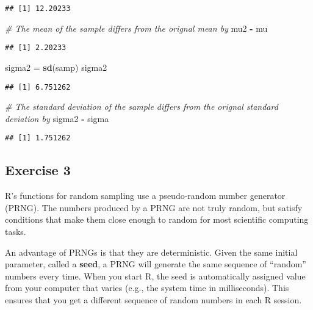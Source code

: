 \documentclass[
]{article}
\newenvironment{Shaded}{\begin{snugshade}}{\end{snugshade}}
\newcommand{\CommentTok}[1]{\textcolor[rgb]{0.56,0.35,0.01}{\textit{#1}}}
\newcommand{\KeywordTok}[1]{\textcolor[rgb]{0.13,0.29,0.53}{\textbf{#1}}}
\newcommand{\NormalTok}[1]{#1}
\newcommand{\OperatorTok}[1]{\textcolor[rgb]{0.81,0.36,0.00}{\textbf{#1}}}
\newcommand{\StringTok}[1]{\textcolor[rgb]{0.31,0.60,0.02}{#1}}
\begin{document}
\begin{verbatim}
## [1] 12.20233
\end{verbatim}

\begin{Shaded}
\begin{Highlighting}[]
\CommentTok{\# The mean of the sample differs from the orignal mean by}
\NormalTok{mu2 }\OperatorTok{{-}}\StringTok{ }\NormalTok{mu}
\end{Highlighting}
\end{Shaded}

\begin{verbatim}
## [1] 2.20233
\end{verbatim}

\begin{Shaded}
\begin{Highlighting}[]
\NormalTok{sigma2 =}\StringTok{ }\KeywordTok{sd}\NormalTok{(samp)}
\NormalTok{sigma2}
\end{Highlighting}
\end{Shaded}

\begin{verbatim}
## [1] 6.751262
\end{verbatim}

\begin{Shaded}
\begin{Highlighting}[]
\CommentTok{\# The standard deviation of the sample differs from the orignal standard deviation by}
\NormalTok{sigma2 }\OperatorTok{{-}}\StringTok{ }\NormalTok{sigma}
\end{Highlighting}
\end{Shaded}

\begin{verbatim}
## [1] 1.751262
\end{verbatim}

\hypertarget{exercise-3}{%
\subsection{Exercise 3}\label{exercise-3}}

R's functions for random sampling use a pseudo-random number generator
(PRNG). The numbers produced by a PRNG are not truly random, but satisfy
conditions that make them close enough to random for most scientific
computing tasks.

An advantage of PRNGs is that they are deterministic. Given the same
initial parameter, called a \textbf{seed}, a PRNG will generate the same
sequence of ``random'' numbers every time. When you start R, the seed is
automatically assigned value from your computer that varies (e.g., the
system time in milliseconds). This ensures that you get a different
sequence of random numbers in each R session.
\end{document}
